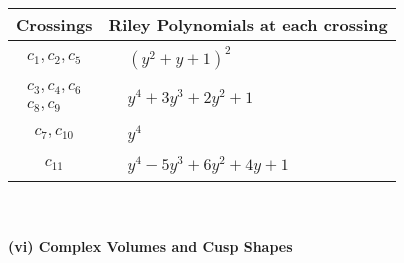 \documentclass[1p]{elsarticle_modified}
\theoremstyle{definition}
\begin{document}
\begin{tabular}{m{50pt}|m{274pt}}
Crossings & \hspace{64pt}Riley Polynomials at each crossing \\
\hline $$\begin{aligned}c_{1},c_{2},c_{5}\end{aligned}$$&$\begin{aligned}
&(y^2+y+1)^2
\end{aligned}$\\
\hline $$\begin{aligned}c_{3},c_{4},c_{6}\\c_{8},c_{9}\end{aligned}$$&$\begin{aligned}
&y^4+3 y^3+2 y^2+1
\end{aligned}$\\
\hline $$\begin{aligned}c_{7},c_{10}\end{aligned}$$&$\begin{aligned}
&y^4
\end{aligned}$\\
\hline $$\begin{aligned}c_{11}\end{aligned}$$&$\begin{aligned}
&y^4-5 y^3+6 y^2+4 y+1
\end{aligned}$\\
\hline
\end{tabular}\\~\\
\newpage\flushleft \textbf{(vi) Complex Volumes and Cusp Shapes}
\end{document}
